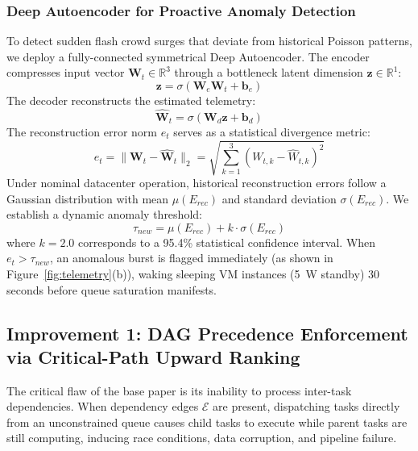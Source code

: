 \documentclass[default,sn-mathphys-num]{sn-jnl}
\theoremstyle{thmstyleone}
\theoremstyle{thmstyletwo}
\theoremstyle{thmstylethree}
\begin{document}
\subsubsection{Deep Autoencoder for Proactive Anomaly Detection}
To detect sudden flash crowd surges that deviate from historical Poisson patterns, we deploy a fully-connected symmetrical Deep Autoencoder. The encoder compresses input vector $\mathbf{W}_t \in \mathbb{R}^3$ through a bottleneck latent dimension $\mathbf{z} \in \mathbb{R}^1$:
\begin{equation}
\mathbf{z} = \sigma \left( \mathbf{W}_e \mathbf{W}_t + \mathbf{b}_e \right)
\end{equation}
The decoder reconstructs the estimated telemetry:
\begin{equation}
\widehat{\mathbf{W}}_t = \sigma \left( \mathbf{W}_d \mathbf{z} + \mathbf{b}_d \right)
\end{equation}
The reconstruction error norm $e_t$ serves as a statistical divergence metric:
\begin{equation}
e_t = \|\mathbf{W}_t - \widehat{\mathbf{W}}_t\|_2 = \sqrt{\sum_{k=1}^3 \left( W_{t, k} - \widehat{W}_{t, k} \right)^2}
\end{equation}
Under nominal datacenter operation, historical reconstruction errors follow a Gaussian distribution with mean $\mu(E_{rec})$ and standard deviation $\sigma(E_{rec})$. We establish a dynamic anomaly threshold:
\begin{equation}
\tau_{new} = \mu(E_{rec}) + k \cdot \sigma(E_{rec})
\end{equation}
where $k = 2.0$ corresponds to a 95.4\% statistical confidence interval. When $e_t > \tau_{new}$, an anomalous burst is flagged immediately (as shown in Figure~\ref{fig:telemetry}(b)), waking sleeping VM instances (5~W standby) 30 seconds before queue saturation manifests.

\subsection{Improvement 1: DAG Precedence Enforcement via Critical-Path Upward Ranking}\label{sec:dag_method}
The critical flaw of the base paper \cite{narsimhulu2026hybrid} is its inability to process inter-task dependencies. When dependency edges $\mathcal{E}$ are present, dispatching tasks directly from an unconstrained queue causes child tasks to execute while parent tasks are still computing, inducing race conditions, data corruption, and pipeline failure.
\end{document}
